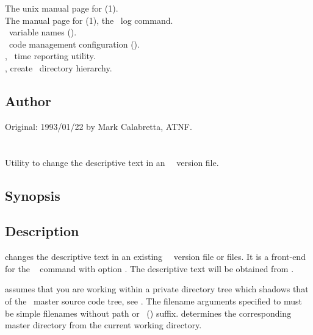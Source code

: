 The unix manual page for (1).\\
The manual page for (1), the \rcs\ log command.\\
\aipspp\ variable names ().\\
\aipspp\ code management configuration ().\\
, \aipspp\ time reporting utility.\\
, create \aipspp\ directory hierarchy.

\subsection*{Author}

Original: 1993/01/22 by Mark Calabretta, ATNF.


\newpage
\section{}
\label{am}

Utility to change the descriptive text in an \aipspp\ \rcs\ version
file.

\subsection*{Synopsis}

\begin{synopsis}
\end{synopsis}

\subsection*{Description}

 changes the descriptive text in an existing \aipspp\ \rcs\ version
file or files.  It is a front-end for the \rcs\  command with
option .  The descriptive text will be obtained from .

 assumes that you are working within a private directory tree which
shadows that of the \aipspp\ master source code tree, see .
The filename arguments specified to  must be simple filenames without
path or \rcs\ () suffix.   determines the corresponding
master directory from the current working directory.

